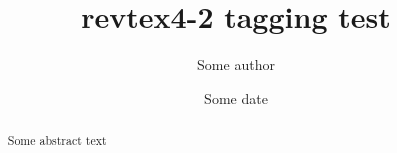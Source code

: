\documentclass[aps,pra]{revtex4-1}
\begin{document}
\title{revtex4-2 tagging test}
\author{Some author}

\date{Some date}

\begin{abstract}
Some abstract text
\end{abstract}

\maketitle

\blinddocument
\end{document}
